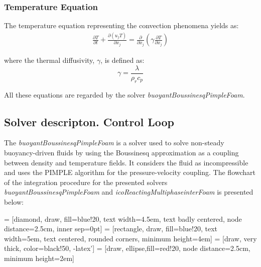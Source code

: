 \subsubsection{Temperature Equation}
\setlength{\parindent}{0.5cm} The temperature equation representing the convection phenomena yields as:
\begin{equation}
	\begin{aligned}
	\frac{\partial T}{\partial t}+ \frac{\partial (u_{j} T)}{\partial x_{j}}=\frac{\partial}{\partial x_{j}}\left(\gamma \frac{\partial T}{\partial x_{j}}\right)
	\end{aligned}
	\label{3.12}
\end{equation}

where the thermal diffusivity, $\gamma$, is defined as:
\begin{equation}
	\gamma=\frac{\lambda}{\rho_{r} c_{p}}
	\label{3.13}
\end{equation}

All these equations are regarded by the solver \textit{buoyantBoussinesqPimpleFoam}.

\subsection{Solver descripton. Control Loop}

\setlength{\parindent}{0.5cm} The \textit{buoyantBoussinesqPimpleFoam} is a solver used to solve non-steady buoyancy-driven fluids by using the Boussinesq approximation as a coupling between density and temperature fields. It considers the fluid as incompressible and uses the PIMPLE algorithm for the pressure-velocity coupling. The flowchart of the integration procedure for the presented solvers \textit{buoyantBoussinesqPimpleFoam} and \textit{icoReactingMultiphaseinterFoam} is presented below:

 = [diamond, draw, fill=blue!20,
text width=4.5em, text badly centered, node distance=2.5cm, inner sep=0pt]
 = [rectangle, draw, fill=blue!20,
text width=5em, text centered, rounded corners, minimum height=4em]
 = [draw, very thick, color=black!50, -latex']
 = [draw, ellipse,fill=red!20, node distance=2.5cm,
minimum height=2em]

